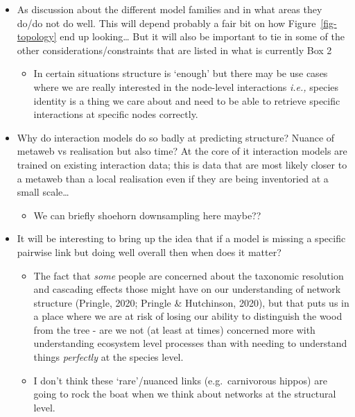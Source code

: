 \documentclass[
]{article}
\providecommand{\tightlist}{%
  \setlength{\itemsep}{0pt}\setlength{\parskip}{0pt}}\usepackage{longtable,booktabs,array}
\begin{document}
\begin{itemize}
\item
  As discussion about the different model families and in what areas
  they do/do not do well. This will depend probably a fair bit on how
  Figure~\ref{fig-topology} end up looking\ldots{} But it will also be
  important to tie in some of the other considerations/constraints that
  are listed in what is currently Box 2

  \begin{itemize}
  \tightlist
  \item
    In certain situations structure is `enough' but there may be use
    cases where we are really interested in the node-level interactions
    \emph{i.e.,} species identity is a thing we care about and need to
    be able to retrieve specific interactions at specific nodes
    correctly.
  \end{itemize}
\item
  Why do interaction models do so badly at predicting structure? Nuance
  of metaweb vs realisation but also time? At the core of it interaction
  models are trained on existing interaction data; this is data that are
  most likely closer to a metaweb than a local realisation even if they
  are being inventoried at a small scale\ldots{}

  \begin{itemize}
  \tightlist
  \item
    We can briefly shoehorn downsampling here maybe??
  \end{itemize}
\item
  It will be interesting to bring up the idea that if a model is missing
  a specific pairwise link but doing well overall then when does it
  matter?

  \begin{itemize}
  \item
    The fact that \emph{some} people are concerned about the taxonomic
    resolution and cascading effects those might have on our
    understanding of network structure (Pringle, 2020; Pringle \&
    Hutchinson, 2020), but that puts us in a place where we are at risk
    of losing our ability to distinguish the wood from the tree - are we
    not (at least at times) concerned more with understanding ecosystem
    level processes than with needing to understand things
    \emph{perfectly} at the species level.
  \item
    I don't think these `rare'/nuanced links (e.g.~carnivorous hippos)
    are going to rock the boat when we think about networks at the
    structural level.
  \end{itemize}
\end{itemize}
\end{document}
